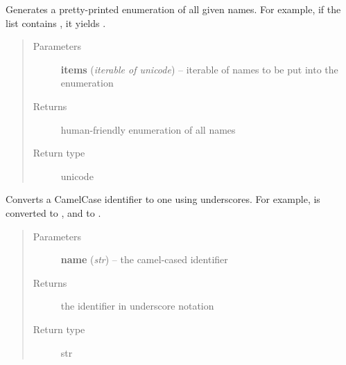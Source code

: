 \documentclass[a4paper,11pt,english]{sphinxmanual}
\begin{document}

\begin{fulllineitems}
\label{programming/utilities:jb_common.utils.base.format_enumeration}
Generates a pretty-printed enumeration of all given names.  For
example, if the list contains \code{{[}"a", "b", "c"{]}}, it yields .
\begin{quote}\begin{description}
\item[{Parameters}] \leavevmode
\textbf{items} (\emph{iterable of unicode}) -- iterable of names to be put into the enumeration

\item[{Returns}] \leavevmode
human-friendly enumeration of all names

\item[{Return type}] \leavevmode
unicode

\end{description}\end{quote}

\end{fulllineitems}


\begin{fulllineitems}
\label{programming/utilities:jb_common.utils.base.camel_case_to_underscores}
Converts a CamelCase identifier to one using underscores.  For example,
 is converted to , and 
to .
\begin{quote}\begin{description}
\item[{Parameters}] \leavevmode
\textbf{name} (\emph{str}) -- the camel-cased identifier

\item[{Returns}] \leavevmode
the identifier in underscore notation

\item[{Return type}] \leavevmode
str

\end{description}\end{quote}

\end{fulllineitems}
\end{document}
